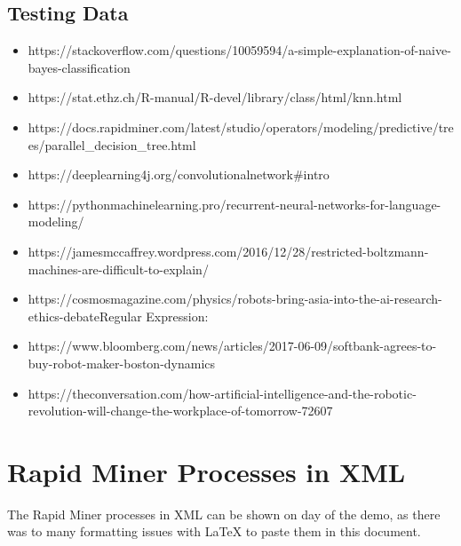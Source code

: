 \subsection{Testing Data}
\begin{itemize}

\item https://stackoverflow.com/questions/10059594/a-simple-explanation-of-naive-bayes-classification

\item https://stat.ethz.ch/R-manual/R-devel/library/class/html/knn.html

\item https://docs.rapidminer.com/latest/studio/operators/modeling/predictive/trees/parallel\_decision\_tree.html

\item https://deeplearning4j.org/convolutionalnetwork\#intro

\item https://pythonmachinelearning.pro/recurrent-neural-networks-for-language-modeling/

\item https://jamesmccaffrey.wordpress.com/2016/12/28/restricted-boltzmann-machines-are-difficult-to-explain/

\item https://cosmosmagazine.com/physics/robots-bring-asia-into-the-ai-research-ethics-debateRegular Expression: 

\item https://www.bloomberg.com/news/articles/2017-06-09/softbank-agrees-to-buy-robot-maker-boston-dynamics

\item https://theconversation.com/how-artificial-intelligence-and-the-robotic-revolution-will-change-the-workplace-of-tomorrow-72607

\end{itemize}


\newpage

\section{Rapid Miner Processes in XML}
The Rapid Miner processes in XML can be shown on day of the demo, as there was to many formatting issues with LaTeX to paste them in this document. 

\newpage

